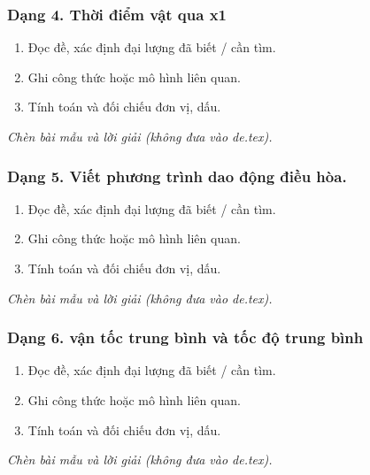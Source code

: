 \subsubsection{Dạng 4. Thời điểm vật qua x1}
\begin{phuongphap}
\begin{enumerate}
\item Đọc đề, xác định đại lượng đã biết / cần tìm.
\item Ghi công thức hoặc mô hình liên quan.
\item Tính toán và đối chiếu đơn vị, dấu.
\end{enumerate}
\end{phuongphap}
\begin{vidumau}
\textit{Chèn bài mẫu và lời giải (không đưa vào de.tex).}
\end{vidumau}

\subsubsection{Dạng 5. Viết phương trình dao động điều hòa.}
\begin{phuongphap}
\begin{enumerate}
\item Đọc đề, xác định đại lượng đã biết / cần tìm.
\item Ghi công thức hoặc mô hình liên quan.
\item Tính toán và đối chiếu đơn vị, dấu.
\end{enumerate}
\end{phuongphap}
\begin{vidumau}
\textit{Chèn bài mẫu và lời giải (không đưa vào de.tex).}
\end{vidumau}

\subsubsection{Dạng 6. vận tốc trung bình và tốc độ trung bình}
\begin{phuongphap}
\begin{enumerate}
\item Đọc đề, xác định đại lượng đã biết / cần tìm.
\item Ghi công thức hoặc mô hình liên quan.
\item Tính toán và đối chiếu đơn vị, dấu.
\end{enumerate}
\end{phuongphap}
\begin{vidumau}
\textit{Chèn bài mẫu và lời giải (không đưa vào de.tex).}
\end{vidumau}

